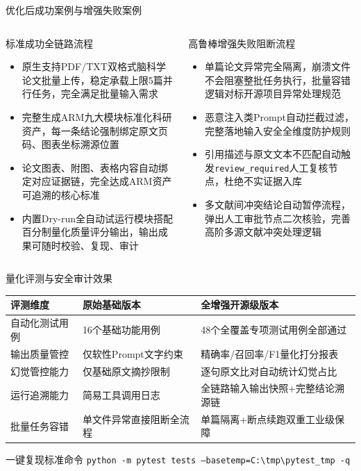 ﻿\documentclass[UTF8,aspectratio=169]{ctexbeamer}
\begin{document}
\begin{frame}{优化后成功案例与增强失败案例}
  \begin{columns}
    \begin{block}{标准成功全链路流程}
      \begin{itemize}
        \item 原生支持PDF/TXT双格式脑科学论文批量上传，稳定承载上限5篇并行任务，完全满足批量输入需求
        \item 完整生成ARM九大模块标准化科研资产，每一条结论强制绑定原文页码、图表坐标溯源位置
        \item 论文图表、附图、表格内容自动绑定对应证据链，完全达成ARM资产可追溯的核心标准
        \item 内置Dry-run全自动试运行模块搭配百分制量化质量评分输出，输出成果可随时校验、复现、审计
      \end{itemize}
    \end{block}
    \begin{block}{高鲁棒增强失败阻断流程}
      \begin{itemize}
        \item 单篇论文异常完全隔离，崩溃文件不会阻塞整批任务执行，批量容错逻辑对标开源项目异常处理规范
        \item 恶意注入类Prompt自动拦截过滤，完整落地输入安全全维度防护规则
        \item 引用描述与原文文本不匹配自动触发\texttt{review\_required}人工复核节点，杜绝不实证据入库
        \item 多文献间冲突结论自动暂停流程，弹出人工审批节点二次核验，完善高阶多源文献冲突处理逻辑
      \end{itemize}
    \end{block}
  \end{columns}
\end{frame}

\begin{frame}{量化评测与安全审计效果}
  \begin{table}
  \centering
  \begin{tabular}{lll}
  \toprule
  评测维度 & 原始基础版本 & 全增强开源级版本 \\
  \midrule
  自动化测试用例 & 16个基础功能用例 & 48个全覆盖专项测试用例全部通过 \\
  输出质量管控 & 仅软性Prompt文字约束 & 精确率/召回率/F1量化打分报表 \\
  幻觉管控能力 & 仅基础原文摘抄限制 & 逐句原文比对自动统计幻觉占比 \\
  运行追溯能力 & 简易工具调用日志 & 全链路输入输出快照+完整结论溯源链 \\
  批量任务容错 & 单文件异常直接阻断全流程 & 单篇隔离+断点续跑双重工业级保障 \\
  \bottomrule
  \end{tabular}
  \end{table}
  \begin{block}{一键复现标准命令}
    \texttt{python -m pytest tests --basetemp=C:\textbackslash tmp\textbackslash pytest\_tmp -q}
  \end{block}
\end{frame}
\end{document}
